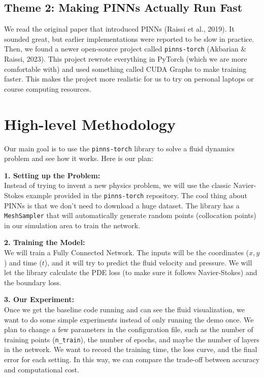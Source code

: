 \documentclass[11pt,a4paper]{article}
\begin{document}
\subsection*{Theme 2: Making PINNs Actually Run Fast}
We read the original paper that introduced PINNs (Raissi et al., 2019). It sounded great, but earlier implementations were reported to be slow in practice. Then, we found a newer open-source project called \texttt{pinns-torch} (Akbarian \& Raissi, 2023). This project rewrote everything in PyTorch (which we are more comfortable with) and used something called CUDA Graphs to make training faster. This makes the project more realistic for us to try on personal laptops or course computing resources.

\section{High-level Methodology}

Our main goal is to use the \texttt{pinns-torch} library to solve a fluid dynamics problem and see how it works. Here is our plan:

\textbf{1. Setting up the Problem:} \\
Instead of trying to invent a new physics problem, we will use the classic Navier-Stokes example provided in the \texttt{pinns-torch} repository. The cool thing about PINNs is that we don't need to download a huge dataset. The library has a \texttt{MeshSampler} that will automatically generate random points (collocation points) in our simulation area to train the network.

\textbf{2. Training the Model:} \\
We will train a Fully Connected Network. The inputs will be the coordinates ($x, y$) and time ($t$), and it will try to predict the fluid velocity and pressure. We will let the library calculate the PDE loss (to make sure it follows Navier-Stokes) and the boundary loss.

\textbf{3. Our Experiment:} \\
Once we get the baseline code running and can see the fluid visualization, we want to do some simple experiments instead of only running the demo once. We plan to change a few parameters in the configuration file, such as the number of training points (\texttt{n\_train}), the number of epochs, and maybe the number of layers in the network. We want to record the training time, the loss curve, and the final error for each setting. In this way, we can compare the trade-off between accuracy and computational cost.
\end{document}
